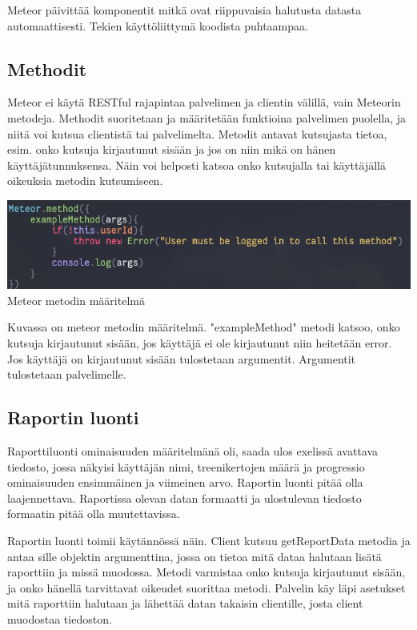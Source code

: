 \medskip

Meteor päivittää komponentit mitkä ovat riippuvaisia halutusta datasta automaattisesti. Tekien käyttöliittymä koodista puhtaampaa.


\medskip



\subsection*{Methodit}

Meteor ei käytä RESTful rajapintaa palvelimen ja clientin välillä, vain Meteorin metodeja.
Methodit suoritetaan ja määritetään funktioina palvelimen puolella, ja niitä voi kutsua clientistä tai palvelimelta.
Metodit antavat kutsujasta tietoa, esim. onko kutsuja kirjautunut sisään ja jos on niin mikä on hänen käyttäjätunnuksensa. 
Näin voi helposti katsoa onko kutsujalla tai käyttäjällä oikeuksia metodin kutsumiseen.
\medskip



\includegraphics[width=15cm]{src/public/methodexample.png}\\
Meteor metodin määritelmä
\medskip

Kuvassa on meteor metodin määritelmä. "exampleMethod"{} metodi katsoo, onko kutsuja kirjautunut sisään, jos käyttäjä ei ole kirjautunut niin heitetään error.
Jos käyttäjä on kirjautunut sisään tulostetaan argumentit. Argumentit tulostetaan palvelimelle.  





\subsection*{Raportin luonti}


Raporttiluonti ominaisuuden määritelmänä oli, saada ulos exelissä avattava tiedosto, jossa näkyisi käyttäjän nimi, treenikertojen määrä ja progressio ominaisuuden ensimmäinen ja viimeinen arvo.
Raportin luonti pitää olla laajennettava. Raportissa olevan datan formaatti ja ulostulevan tiedosto formaatin pitää olla muutettavissa.
\medskip



Raportin luonti toimii käytännössä näin.
Client kutsuu getReportData metodia ja antaa sille objektin argumenttina, jossa on tietoa mitä dataa halutaan lisätä raporttiin ja missä muodossa.
Metodi varmistaa onko kutsuja kirjautunut sisään, ja onko hänellä tarvittavat oikeudet suorittaa metodi.
Palvelin käy läpi asetukset mitä raporttiin halutaan ja lähettää datan takaisin clientille, josta client muodostaa tiedoston.
\medskip



